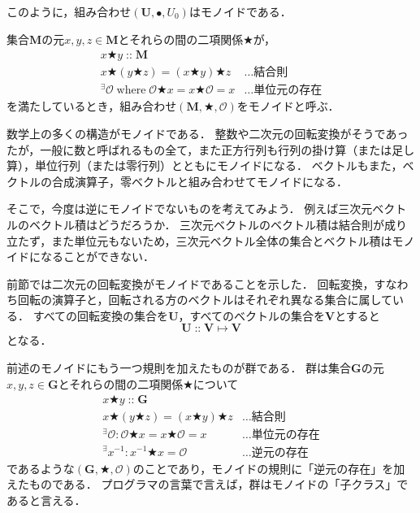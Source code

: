 \documentclass[twocolumn]{jsbook}
\newenvironment{point}{\begin{screen}}{\end{screen}}
\newcommand{\istypeof}{\mathop{::}}
\newcommand{\mathbinaryop}{\bigstar}
\newcommand{\mathidentity}{\mathcal{O}}
\newcommand{\mathsetname}[1]{\boldsymbol{#1}}
\newcommand{\mathtriple}[3]{(#1,#2,#3)}
\newcommand{\mathcompose}{\bullet}
\newcommand{\mathwhere}{\mathop{\text{where}}}
\begin{document}
このように，組み合わせ$\mathtriple{\mathsetname{U}}{\mathcompose}{U_0}$はモノイドである．

\begin{point}
集合$\mathsetname{M}$の元$x,y,z\in\mathsetname{M}$とそれらの間の二項関係$\mathbinaryop$が，
\begin{align*}
x\mathbinaryop y\istypeof\mathsetname{M}\\
x\mathbinaryop(y\mathbinaryop z)=(x\mathbinaryop y)\mathbinaryop z&\dots\text{結合則}\\
{}^\exists\mathidentity\mathwhere\mathidentity\mathbinaryop x=x\mathbinaryop\mathidentity=x&\dots\text{単位元の存在}
\end{align*}
を満たしているとき，組み合わせ$\mathtriple{\mathsetname{M}}{\mathbinaryop}{\mathidentity}$をモノイドと呼ぶ．
\end{point}

数学上の多くの構造がモノイドである．
整数や二次元の回転変換がそうであったが，一般に数と呼ばれるもの全て，また正方行列も行列の掛け算（または足し算），単位行列（または零行列）とともにモノイドになる．
ベクトルもまた，ベクトルの合成演算子，零ベクトルと組み合わせてモノイドになる．

そこで，今度は逆にモノイドでないものを考えてみよう．
例えば三次元ベクトルのベクトル積はどうだろうか．
三次元ベクトルのベクトル積は結合則が成り立たず，また単位元もないため，三次元ベクトル全体の集合とベクトル積はモノイドになることができない．


前節では二次元の回転変換がモノイドであることを示した．
回転変換，すなわち回転の演算子と，回転される方のベクトルはそれぞれ異なる集合に属している．
すべての回転変換の集合を$\mathsetname{U}$，すべてのベクトルの集合を$\mathsetname{V}$とすると$$\mathsetname{U}\istypeof\mathsetname{V}\mapsto\mathsetname{V}$$となる．



前述のモノイドにもう一つ規則を加えたものが群である．
群は集合$\mathsetname{G}$の元$x,y,z\in\mathsetname{G}$とそれらの間の二項関係$\mathbinaryop$について
\begin{align}
x\mathbinaryop y\istypeof\mathsetname{G}\\
x\mathbinaryop(y\mathbinaryop z)=(x\mathbinaryop y)\mathbinaryop z&\dots\text{結合則}\\
{}^\exists\mathidentity:\mathidentity\mathbinaryop x=x\mathbinaryop\mathidentity=x&\dots\text{単位元の存在}\\
{}^\exists x^{-1}:x^{-1}\mathbinaryop x=\mathidentity&\dots\text{逆元の存在}
\end{align}
であるような$\mathtriple{\mathsetname{G}}{\mathbinaryop}{\mathidentity}$のことであり，モノイドの規則に「逆元の存在」を加えたものである．
プログラマの言葉で言えば，群はモノイドの「子クラス」であると言える．
\end{document}
